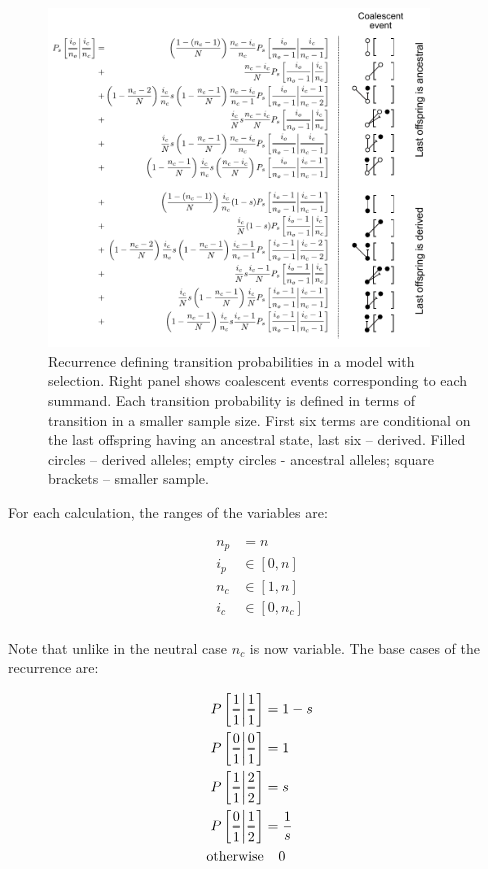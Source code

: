 \documentclass[review]{elsarticle}
\newcommand{\Dfrac}[2]{%
  \ooalign{%
    $\genfrac{}{}{1.2pt}0{#1}{#2}$\cr%
    $\color{white}\genfrac{}{}{.4pt}0{\phantom{#1}}{\phantom{#2}}$}%
}
\newcommand{\cond}{\middle\vert}
\begin{document}
\begin{figure}
  \centering
  \includegraphics[width=0.9\textwidth]{fig/recurrence-selection-annotated.pdf}
  \caption{Recurrence defining transition probabilities in a model with selection. Right panel
    shows coalescent events corresponding to each summand. Each transition probability is defined in
    terms of transition in a smaller sample size. First six terms are conditional on the last
    offspring having an ancestral state, last six -- derived. Filled circles -- derived alleles;
    empty circles - ancestral alleles; square brackets -- smaller sample.}
  \label{fig:rec-selection}
\end{figure}

For each calculation, the ranges of the variables are:

\begin{equation}
  \begin{aligned}
    n_p &= n \\
    i_p &\in [0, n] \\
    n_c &\in [1, n] \\
    i_c &\in [0, n_c] \\
  \end{aligned}
\end{equation}

Note that unlike in the neutral case $n_c$ is now variable. The base cases of the recurrence are:

\begin{equation*}
  \begin{aligned}
    P\left[ \Dfrac{1}{1} \cond \Dfrac{1}{1} \right] &= 1-s \\
    P\left[ \Dfrac{0}{1} \cond \Dfrac{0}{1} \right] &= 1 \\
    P\left[ \Dfrac{1}{1} \cond \Dfrac{2}{2} \right] &= s \\
    P\left[ \Dfrac{0}{1} \cond \Dfrac{1}{2} \right] &= \frac{1}{s} \\
    \text{otherwise} &\phantom{{}=} 0
  \end{aligned}
\end{equation*}
\end{document}
